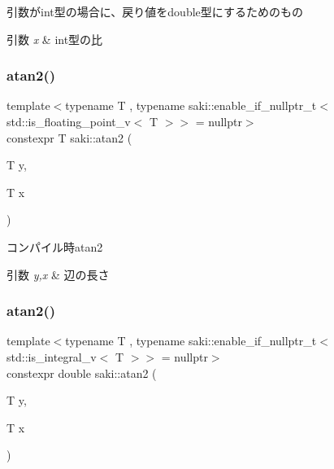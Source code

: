 引数がint型の場合に、戻り値をdouble型にするためのもの 


\begin{DoxyParams}{引数}
{\em x} & int型の比 \\
\hline
\end{DoxyParams}
\mbox{\label{namespacesaki_ac528a4ab6013623bfe6257229e302015}} 
\subsubsection{\texorpdfstring{atan2()}{atan2()}\hspace{0.1cm}{\footnotesize\ttfamily [1/3]}}
{\footnotesize\ttfamily template$<$typename T , typename saki\+::enable\+\_\+if\+\_\+nullptr\+\_\+t$<$ std\+::is\+\_\+floating\+\_\+point\+\_\+v$<$ T $>$$>$  = nullptr$>$ \\
constexpr T saki\+::atan2 (\begin{DoxyParamCaption}\item[{T}]{y,  }\item[{T}]{x }\end{DoxyParamCaption})}



コンパイル時atan2 


\begin{DoxyParams}{引数}
{\em y,x} & 辺の長さ \\
\hline
\end{DoxyParams}
\mbox{\label{namespacesaki_a1f8c6dc6223b790f6d227c8d22cf8b86}} 
\subsubsection{\texorpdfstring{atan2()}{atan2()}\hspace{0.1cm}{\footnotesize\ttfamily [2/3]}}
{\footnotesize\ttfamily template$<$typename T , typename saki\+::enable\+\_\+if\+\_\+nullptr\+\_\+t$<$ std\+::is\+\_\+integral\+\_\+v$<$ T $>$$>$  = nullptr$>$ \\
constexpr double saki\+::atan2 (\begin{DoxyParamCaption}\item[{T}]{y,  }\item[{T}]{x }\end{DoxyParamCaption})}



